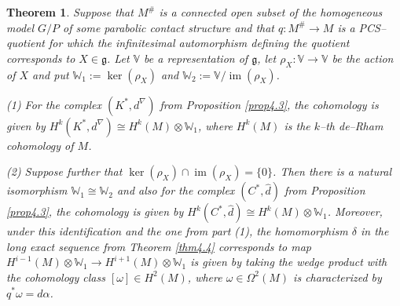 \documentclass[12pt,a4paper]{amsart}
\def\frak{\mathfrak}
\def\Bbb{\mathbb}
\newcommand{\al}{\alpha}
\newcommand{\om}{\omega}
\newcommand{\Om}{\Omega}
\newcommand{\im}{\operatorname{im}}
\newcounter{theorem}
\numberwithin{theorem}{section}
\newtheorem{thm}[theorem]{Theorem}
\theoremstyle{definition}
\theoremstyle{remark}
\begin{document}
\begin{thm}\label{thm4.5}
  Suppose that $M^\#$ is a connected open subset of the homogeneous
  model $G/P$ of some parabolic contact structure and that $q:M^\#\to
  M$ is a PCS--quotient for which the infinitesimal automorphism
  defining the quotient corresponds to $X\in\frak g$. Let $\Bbb V$ be
  a representation of $\frak g$, let $\rho_X:\Bbb V\to\Bbb V$ be the
  action of $X$ and put $\Bbb W_1:=\ker(\rho_X)$ and $\Bbb W_2:=\Bbb
  V/\im(\rho_X)$.

  (1) For the complex $(K^*,d^\nabla)$ from Proposition \ref{prop4.3}, the
  cohomology is given by $H^k(K^*,d^\nabla)\cong H^k(M)\otimes\Bbb
  W_1$, where $H^k(M)$ is the $k$--th de--Rham cohomology of $M$.

  (2) Suppose further that $\ker(\rho_X)\cap\im(\rho_X)=\{0\}$. Then
  there is a natural isomorphism $\Bbb W_1\cong\Bbb W_2$ and also for
  the complex $(C^*,\hat d)$ from Proposition \ref{prop4.3}, the
  cohomology is given by $H^k(C^*,\hat d)\cong H^k(M)\otimes\Bbb
  W_1$. Moreover, under this identification and the one from part (1),
  the homomorphism $\delta$ in the long exact sequence from Theorem
  \ref{thm4.4} corresponds to map $H^{i-1}(M)\otimes\Bbb W_1\to
  H^{i+1}(M)\otimes\Bbb W_1$ is given by taking the wedge product with
  the cohomology class $[\om]\in H^2(M)$, where $\om\in\Om^2(M)$ is
  characterized by $q^*\om=d\al$.
\end{thm}
\end{document}
